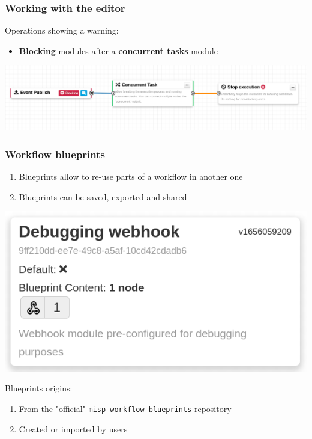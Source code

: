 \begin{frame}
    \frametitle{Working with the editor}
    Operations showing a warning:
    \begin{itemize}
        \item \textbf{Blocking} modules after a \textbf{concurrent tasks} module
    \end{itemize}
    \begin{center}
        \includegraphics[width=1.0\linewidth]{pictures/editor-warning-1.png}
    \end{center}
\end{frame}

\begin{frame}
    \frametitle{Workflow blueprints}
    \begin{enumerate}
        \item Blueprints allow to re-use parts of a workflow in another one
        \item Blueprints can be saved, exported and shared
    \end{enumerate}
    \begin{center}
        \includegraphics[width=0.5\linewidth]{pictures/blueprint-debugging.png}
    \end{center}
    Blueprints origins:
    \begin{enumerate}
        \item From the "official" \texttt{misp-workflow-blueprints} repository
        \item Created or imported by users
    \end{enumerate}
\end{frame}

